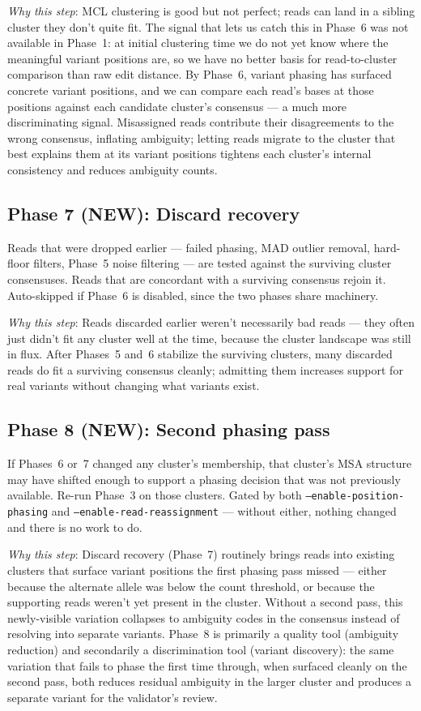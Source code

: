 \documentclass[11pt]{article}
\begin{document}
\emph{Why this step}: MCL clustering is good but not perfect; reads can land
in a sibling cluster they don't quite fit. The signal that lets us catch
this in Phase~6 was not available in Phase~1: at initial clustering time we
do not yet know where the meaningful variant positions are, so we have no
better basis for read-to-cluster comparison than raw edit distance. By
Phase~6, variant phasing has surfaced concrete variant positions, and we
can compare each read's bases at those positions against each candidate
cluster's consensus --- a much more discriminating signal. Misassigned
reads contribute their disagreements to the wrong consensus, inflating
ambiguity; letting reads migrate to the cluster that best explains them at
its variant positions tightens each cluster's internal consistency and
reduces ambiguity counts.

\subsection*{Phase 7 (NEW): Discard recovery}

Reads that were dropped earlier --- failed phasing, MAD outlier removal,
hard-floor filters, Phase~5 noise filtering --- are tested against the
surviving cluster consensuses. Reads that are concordant with a surviving
consensus rejoin it. Auto-skipped if Phase~6 is disabled, since the two
phases share machinery.

\emph{Why this step}: Reads discarded earlier weren't necessarily bad reads
--- they often just didn't fit any cluster well at the time, because the
cluster landscape was still in flux. After Phases~5 and~6 stabilize the
surviving clusters, many discarded reads do fit a surviving consensus
cleanly; admitting them increases support for real variants without changing
what variants exist.

\subsection*{Phase 8 (NEW): Second phasing pass}

If Phases~6 or~7 changed any cluster's membership, that cluster's MSA
structure may have shifted enough to support a phasing decision that was not
previously available. Re-run Phase~3 on those clusters. Gated by both
\texttt{--enable-position-phasing} and \texttt{--enable-read-reassignment}
--- without either, nothing changed and there is no work to do.

\emph{Why this step}: Discard recovery (Phase~7) routinely brings reads into
existing clusters that surface variant positions the first phasing pass
missed --- either because the alternate allele was below the count threshold,
or because the supporting reads weren't yet present in the cluster. Without a
second pass, this newly-visible variation collapses to ambiguity codes in the
consensus instead of resolving into separate variants. Phase~8 is primarily
a quality tool (ambiguity reduction) and secondarily a discrimination tool
(variant discovery): the same variation that fails to phase the first time
through, when surfaced cleanly on the second pass, both reduces residual
ambiguity in the larger cluster and produces a separate variant for the
validator's review.
\end{document}
